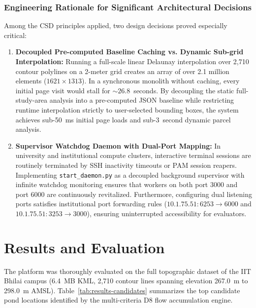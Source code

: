 \documentclass[manuscript,screen,review]{acmart}
\begin{document}
\subsubsection*{Engineering Rationale for Significant Architectural Decisions}
Among the CSD principles applied, two design decisions proved especially critical:
\begin{enumerate}
    \item \textbf{Decoupled Pre-computed Baseline Caching vs. Dynamic Sub-grid Interpolation:} Running a full-scale linear Delaunay interpolation over 2,710 contour polylines on a 2-meter grid creates an array of over 2.1 million elements ($1621 \times 1313$). In a synchronous monolith without caching, every initial page visit would stall for $\sim 26.8$~seconds. By decoupling the static full-study-area analysis into a pre-computed JSON baseline while restricting runtime interpolation strictly to user-selected bounding boxes, the system achieves sub-50~ms initial page loads and sub-3~second dynamic parcel analysis.
    \item \textbf{Supervisor Watchdog Daemon with Dual-Port Mapping:} In university and institutional compute clusters, interactive terminal sessions are routinely terminated by SSH inactivity timeouts or PAM session reapers. Implementing \texttt{start\_daemon.py} as a decoupled background supervisor with infinite watchdog monitoring ensures that workers on both port 3000 and port 6000 are continuously revitalized. Furthermore, configuring dual listening ports satisfies institutional port forwarding rules ($10.1.75.51:6253 \rightarrow 6000$ and $10.1.75.51:3253 \rightarrow 3000$), ensuring uninterrupted accessibility for evaluators.
\end{enumerate}

\section{Results and Evaluation}
\label{sec:results}
The platform was thoroughly evaluated on the full topographic dataset of the IIT Bhilai campus (6.4~MB KML, 2,710 contour lines spanning elevation 267.0~m to 298.0~m AMSL). Table~\ref{tab:results-candidates} summarizes the top candidate pond locations identified by the multi-criteria D8 flow accumulation engine.
\end{document}
